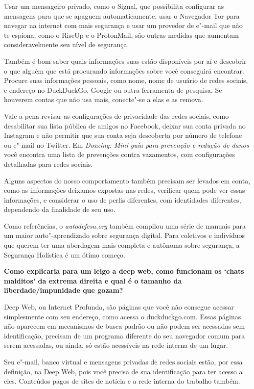 Usar um mensageiro privado, como o
Signal, que possibilita configurar as
mensagens para que se apaguem automaticamente, usar o
Navegador Tor para navegar na
internet com mais segurança e usar um provedor de e"-mail que não te
espiona, como o RiseUp e o
ProtonMail, são outras
medidas que aumentam consideravelmente seu nível de segurança.

Também é bom saber quais informações suas estão disponíveis por aí e
descobrir o que alguém que está procurando informações sobre você
conseguirá encontrar. Procure suas informações pessoais, como nome, nome
de usuário de redes sociais,  e endereço no DuckDuckGo, Google ou
outra ferramenta de pesquisa. Se houverem contas que não usa mais,
conecte"-se a elas e as remova.

Vale a pena revisar as configurações de privacidade das redes sociais,
como desabilitar sua lista pública de amigos no Facebook, deixar sua
conta privada no Instagram e não permitir que sua conta seja descoberta
por número de telefone ou e"-mail no Twitter. Em
\emph{Doxxing:
Mini guia para prevenção e redução de danos} você encontra uma
lista de prevenções contra vazamentos, com configurações detalhadas para
redes sociais.

Alguns aspectos do nosso comportamento também precisam ser levados em
conta, como as informações deixamos expostas nas redes, verificar quem
pode ver essas informações, e considerar o uso de perfis diferentes, com
identidades diferentes, dependendo da finalidade de seu uso.

Como referências, o \emph{autodefesa.org} também compilou uma série de manuais para um maior auto"-aprendizado
sobre segurança digital. Para coletivos e indivíduos que querem ter uma
abordagem mais completa e autônoma sobre segurança, a
Segurança Holística é um ótimo começo.

\bigskip

\noindent{}\textbf{Como explicaria para um leigo a deep web, como funcionam os
`chats malditos' da extrema direita e qual é o tamanho da
liberdade/impunidade que gozam?}

Deep Web, ou Internet Profunda, são páginas que
você não consegue acessar simplesmente com seu endereço, como acessa o
duckduckgo.com. Essas páginas não aparecem em mecanismos de busca padrão
ou não podem ser acessadas sem identificação, precisam de um programa
diferente do seu navegador comum para serem acessadas, ou ainda, só
estão acessíveis na rede interna de um lugar.

Seu e"-mail, banco virtual e mensagens privadas de redes sociais estão,
por essa definição, na Deep Web, pois você precisa de sua identificação
para ter acesso a eles. Conteúdos pagos de sites de notícia e a rede
interna do trabalho também.

